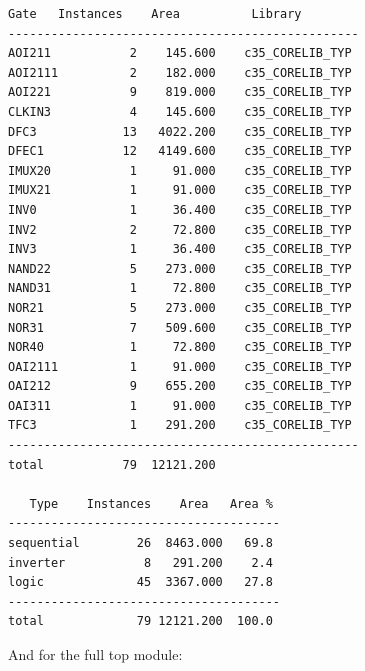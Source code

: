 \documentclass[12pt]{article}
\begin{document}
\begin{lstlisting}[caption={Gate count and circuit area of the given circuit.},captionpos=b]
  Gate   Instances    Area          Library      
-------------------------------------------------
AOI211           2    145.600    c35_CORELIB_TYP 
AOI2111          2    182.000    c35_CORELIB_TYP 
AOI221           9    819.000    c35_CORELIB_TYP 
CLKIN3           4    145.600    c35_CORELIB_TYP 
DFC3            13   4022.200    c35_CORELIB_TYP 
DFEC1           12   4149.600    c35_CORELIB_TYP 
IMUX20           1     91.000    c35_CORELIB_TYP 
IMUX21           1     91.000    c35_CORELIB_TYP 
INV0             1     36.400    c35_CORELIB_TYP 
INV2             2     72.800    c35_CORELIB_TYP 
INV3             1     36.400    c35_CORELIB_TYP 
NAND22           5    273.000    c35_CORELIB_TYP 
NAND31           1     72.800    c35_CORELIB_TYP 
NOR21            5    273.000    c35_CORELIB_TYP 
NOR31            7    509.600    c35_CORELIB_TYP 
NOR40            1     72.800    c35_CORELIB_TYP 
OAI2111          1     91.000    c35_CORELIB_TYP 
OAI212           9    655.200    c35_CORELIB_TYP 
OAI311           1     91.000    c35_CORELIB_TYP 
TFC3             1    291.200    c35_CORELIB_TYP 
-------------------------------------------------
total           79  12121.200                    
                                      
   Type    Instances    Area   Area % 
--------------------------------------
sequential        26  8463.000   69.8 
inverter           8   291.200    2.4 
logic             45  3367.000   27.8 
--------------------------------------
total             79 12121.200  100.0 
    \end{lstlisting} 
    
And for the full top module:
    
\end{document}
